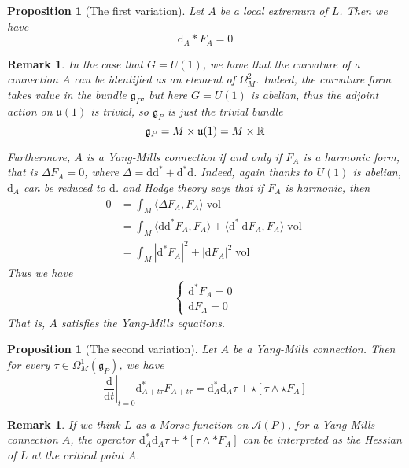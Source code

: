 \documentclass[11pt]{amsart}
\numberwithin{equation}{section}
\theoremstyle{plain}
\theoremstyle{plain}
\newtheorem{propsub}[thmsub]{Proposition}
\newtheorem{remksub}[thmsub]{Remark}
\numberwithin{equation}{section}
\begin{document}
\begin{propsub}[The first variation]
Let $A$ be a local extremum of $L$. Then we have
$$
\mathrm{d}_A*F_A=0
$$
\end{propsub}
\begin{remksub}\normalfont
In the case that $G=U(1)$, we have that the curvature of a connection $A$ can be identified as an element of $\Omega_M^2$. Indeed, the curvature form takes value in the bundle $\mathfrak{g}_P$, but here $G=U(1)$ is abelian, thus the adjoint action on $\mathfrak{u}(1)$ is trivial, so $\mathfrak{g}_P$ is just the trivial bundle 
$$
\mathfrak{g}_P=M\times\mathfrak{u}(1)=M\times\Bbb{R}
$$

Furthermore, $A$ is a Yang-Mills connection if and only if $F_A$ is a harmonic form, that is $\Delta F_A=0$, where $\Delta=\mathrm{d}\mathrm{d}^*+\mathrm{d}^*\mathrm{d}$. Indeed, again thanks to $U(1)$ is abelian, $\mathrm{d}_A$ can be reduced to $\mathrm{d}$. and Hodge theory says that if $F_A$ is harmonic, then
$$
\begin{aligned}
0 &=\int_{M}\langle\Delta F_A, F_A\rangle\operatorname{vol} \\
&=\int_{M}\langle\mathrm{dd}^{*} F_A, F_A\rangle+\langle\mathrm{d}^{*} \mathrm{~d} F_A, F_A\rangle\operatorname{vol} \\
&=\int_{M}|\mathrm{d}^{*} F_A|^{2}+|\mathrm{d} F_A|^{2}\operatorname{vol}
\end{aligned}
$$
Thus we have 
$$
\begin{cases}
\mathrm{d}^*F_A=0\\
\mathrm{d}F_A=0
\end{cases}
$$
That is, $A$ satisfies the Yang-Mills equations.
\end{remksub}

\begin{propsub}[The second variation]
Let $A$ be a Yang-Mills connection. Then for every $\tau\in\Omega_M^1(\mathfrak{g}_P)$, we have
$$
\left.\frac{\mathrm{d}}{\mathrm{d} t}\right|_{t=0} \mathrm{d}_{A+t \tau}^{*} F_{A+t \tau}=\mathrm{d}_{A}^{*} \mathrm{d}_{A} \tau+\star\left[\tau \wedge \star F_{A}\right]
$$
\end{propsub}
\begin{remksub}\normalfont
If we think $L$ as a Morse function on $\mathscr{A}(P)$, for a Yang-Mills connection $A$, the operator $\mathrm{d}_A^*\mathrm{d}_A\tau+*[\tau\wedge*F_A]$ can be interpreted as the Hessian of $L$ at the critical point $A$. 
\end{remksub}
\end{document}
